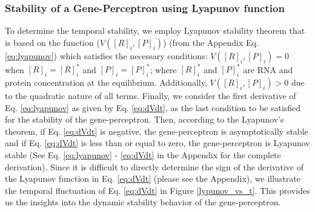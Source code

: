 \documentclass[twocolumn]{biophys-new}
\newcommand{\sm}[1]{\textcolor{brown}{#1}}
\begin{document}
{{\subsubsection*{Stability of a Gene-Perceptron using Lyapunov function}
To determine the temporal  stability, we employ Lyapunov stability theorem that is based on the  function ($V([R]_i, [P]_i)$) (from the Appendix Eq. \ref{eq:lyapunov}) which satisfies the necessary conditions: 
$V \left( [R]_i, [P]_i \right)=0$ when $[R]_i= [R]_i^*$ and $[P]_i= [P]_i^*$; where $[R]_i^*$ and $[P]_i^*$ are RNA and protein concentration  at the equilibrium. Additionally, $V \left( [R]_i, [P]_i \right)>0$ due to the quadratic nature of all terms. Finally, we consider the first derivative of Eq. \ref{eq:lyapunov} as given by Eq. \ref{eq:dVdt}, as the last condition to be satisfied for the stability of the gene-perceptron. Then, according to the Lyapunov's theorem, if Eq. \ref{eq:dVdt} is negative, the gene-perceptron is asymptotically stable and if Eq. \ref{eq:dVdt} is less than or equal to zero,  the gene-perceptron is Lyapunov stable (See Eq. \ref{eq:lyapunov} - \ref{eq:dVdt} in the Appendix for the complete derivation). Since it is difficult to directly determine the sign  of the derivative of the Lyapunov function in Eq. \ref{eq:dVdt} (please see the Appendix), we illustrate the temporal fluctuation of Eq. \ref{eq:dVdt} in Figure \ref{lypunov_vs_t}. This provides us the insights into the dynamic stability behavior of the gene-perceptron.   



}}
\end{document}
